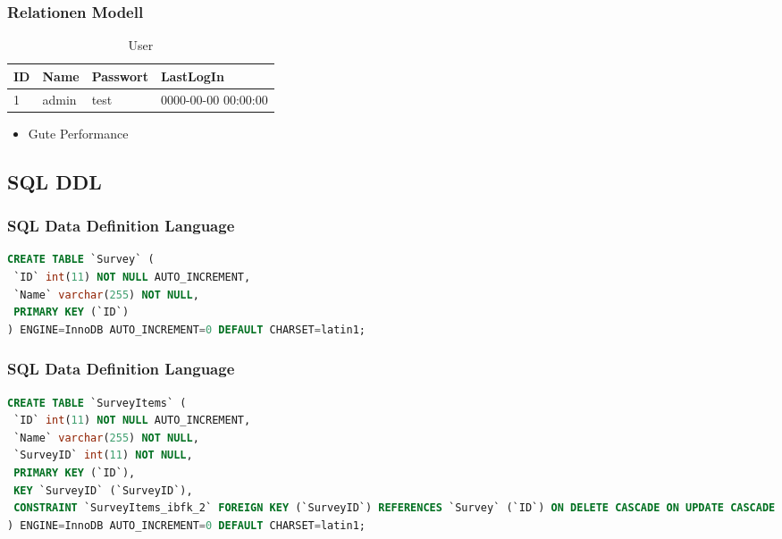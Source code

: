 \documentclass[xcolor=dvipsnames]{beamer}
\begin{document}
\begin{frame} %
  \frametitle{Relationen Modell} %

\begin{table}
\begin{tabular}{|l|l|l|l|} \hline\hline
\textbf{ID} & \textbf{Name}  & \textbf{Passwort} & \textbf{LastLogIn}\\
\hline
1 & admin & test & 0000-00-00 00:00:00 \\
\hline\hline
\end{tabular}
  \caption{User}
  \end{table}

	\begin{block}{}		
		\begin{itemize}[]
			\item Gute Performance 
		\end{itemize}
	\end{block}

\end{frame}


\subsection{SQL DDL}
\begin{frame}[fragile] %
\frametitle{SQL Data Definition Language} %

\begin{lstlisting}[language=SQL, caption=database.sql]
CREATE TABLE `Survey` (
 `ID` int(11) NOT NULL AUTO_INCREMENT,
 `Name` varchar(255) NOT NULL,
 PRIMARY KEY (`ID`)
) ENGINE=InnoDB AUTO_INCREMENT=0 DEFAULT CHARSET=latin1;
\end{lstlisting} 
\end{frame}

\begin{frame}[fragile] %
\frametitle{SQL Data Definition Language} %

\begin{lstlisting}[language=SQL, caption=database.sql]
CREATE TABLE `SurveyItems` (
 `ID` int(11) NOT NULL AUTO_INCREMENT,
 `Name` varchar(255) NOT NULL,
 `SurveyID` int(11) NOT NULL,
 PRIMARY KEY (`ID`),
 KEY `SurveyID` (`SurveyID`),
 CONSTRAINT `SurveyItems_ibfk_2` FOREIGN KEY (`SurveyID`) REFERENCES `Survey` (`ID`) ON DELETE CASCADE ON UPDATE CASCADE
) ENGINE=InnoDB AUTO_INCREMENT=0 DEFAULT CHARSET=latin1;
\end{lstlisting} 
\end{frame}
\end{document}
